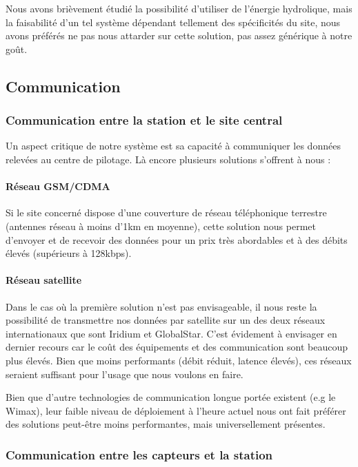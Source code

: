 Nous avons brièvement étudié la possibilité d’utiliser de l’énergie hydrolique, mais la faisabilité d’un tel système dépendant tellement des spécificités du site, nous avons préférés ne pas nous attarder sur cette solution, pas assez générique à notre goût.

\subsection{Communication}

\subsubsection{Communication entre la station et le site central}

Un aspect critique de notre système est sa capacité à communiquer les données relevées au centre de pilotage. Là encore plusieurs solutions s’offrent à nous :

\paragraph{Réseau GSM/CDMA}

Si le site concerné dispose d’une couverture de réseau téléphonique terrestre (antennes réseau à moins d’1km en moyenne), cette solution nous permet d’envoyer et de recevoir des données pour un prix très abordables et à des débits élevés (supérieurs à 128kbps).

\paragraph{Réseau satellite}

Dans le cas où la première solution n’est pas envisageable, il nous reste la possibilité de transmettre nos données par satellite sur un des deux réseaux internationaux que sont Iridium et GlobalStar. C’est évidement à envisager en dernier recours car le coût des équipements et des communication sont beaucoup plus élevés. Bien que moins performants (débit réduit, latence élevés), ces réseaux seraient suffisant pour l’usage que nous voulons en faire.

Bien que d’autre technologies de communication longue portée existent (e.g le Wimax), leur faible niveau de déploiement à l’heure actuel nous ont fait préférer des solutions peut-être moins performantes, mais universellement présentes.

\subsubsection{Communication entre les capteurs et la station}

